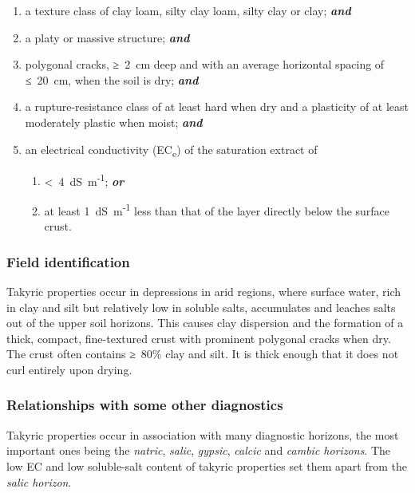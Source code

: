 \documentclass[
  letterpaper,
  DIV=11,
  numbers=noendperiod]{scrreprt}
\providecommand{\tightlist}{%
  \setlength{\itemsep}{0pt}\setlength{\parskip}{0pt}}\usepackage{longtable,booktabs,array}
\begin{document}
\begin{enumerate}
\def\labelenumi{\arabic{enumi}.}
\tightlist
\item
  a texture class of clay loam, silty clay loam, silty clay or clay;
  \textbf{\emph{and}}
\item
  a platy or massive structure; \textbf{\emph{and}}
\item
  polygonal cracks, ≥~2~cm deep and with an average horizontal spacing
  of ≤~20~cm, when the soil is dry; \textbf{\emph{and}}
\item
  a rupture-resistance class of at least hard when dry and a plasticity
  of at least moderately plastic when moist; \textbf{\emph{and}}
\item
  an electrical conductivity (EC\textsubscript{e}) of the saturation
  extract of

  \begin{enumerate}
  \def\labelenumii{\alph{enumii}.}
  \tightlist
  \item
    \textless~4~dS~m\textsuperscript{-1}; \textbf{\emph{or}}
  \item
    at least 1~dS~m\textsuperscript{-1} less than that of the layer
    directly below the surface crust.
  \end{enumerate}
\end{enumerate}

\hypertarget{field-identification-38}{%
\subsubsection{Field identification}\label{field-identification-38}}

Takyric properties occur in depressions in arid regions, where surface
water, rich in clay and silt but relatively low in soluble salts,
accumulates and leaches salts out of the upper soil horizons. This
causes clay dispersion and the formation of a thick, compact,
fine-textured crust with prominent polygonal cracks when dry. The crust
often contains ≥~80\% clay and silt. It is thick enough that it does not
curl entirely upon drying.

\hypertarget{relationships-with-some-other-diagnostics-49}{%
\subsubsection{Relationships with some other
diagnostics}\label{relationships-with-some-other-diagnostics-49}}

Takyric properties occur in association with many diagnostic horizons,
the most important ones being the \emph{natric}, \emph{salic},
\emph{gypsic}, \emph{calcic} and \emph{cambic horizons}. The low EC and
low soluble-salt content of takyric properties set them apart from the
\emph{salic horizon}.
\end{document}
